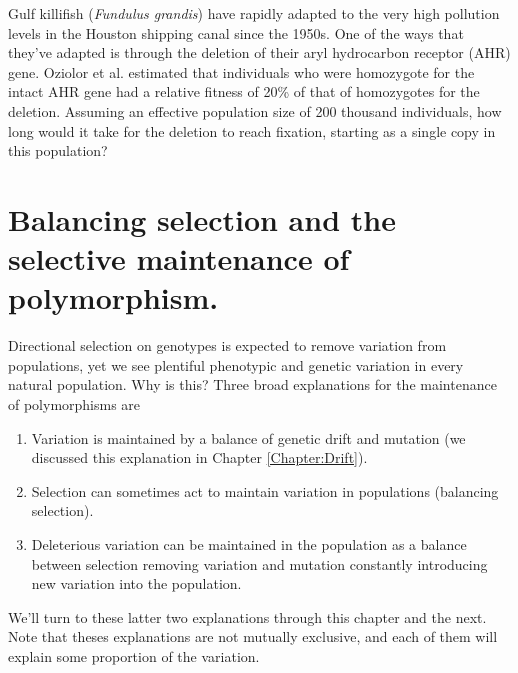\begin{question}
Gulf killifish ({\it Fundulus grandis}) have rapidly adapted to the very high pollution levels in the Houston shipping canal since the 1950s. One of the ways that they've adapted is through the deletion of their aryl hydrocarbon receptor (AHR) gene. Oziolor et al. estimated that individuals who were homozygote for the intact AHR gene had a relative fitness of 20\% of that of homozygotes for the deletion. Assuming an effective population size of 200 thousand individuals, how long would it take for the deletion to reach fixation, starting as a single copy in this population?
\end{question}



\section{Balancing selection and the selective maintenance of polymorphism.}
Directional selection on genotypes is expected to remove variation
from populations, yet we see plentiful phenotypic and genetic
variation in every natural population. Why is this? Three broad
explanations for the maintenance of polymorphisms are
\begin{enumerate}
\item Variation is maintained by a balance of genetic drift and
  mutation (we discussed this explanation in Chapter
  \ref{Chapter:Drift}).
  \item Selection can sometimes act to maintain variation in
    populations (balancing selection). 
    \item Deleterious variation can be maintained in the population as
      a balance between selection removing variation and mutation
      constantly introducing new variation into the population. 
\end{enumerate}
We'll turn to these latter two explanations through this chapter and
the next.
Note that theses explanations are not mutually exclusive, and each of them will explain some proportion of the variation. 

